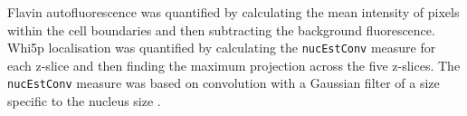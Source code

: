 Flavin autofluorescence was quantified by calculating the mean intensity of pixels within the cell boundaries and then subtracting the background fluorescence. %
Whi5p localisation was quantified by calculating the \texttt{nucEstConv} measure for each z-slice and then finding the maximum projection across the five z-slices.
The \texttt{nucEstConv} measure was based on convolution with a Gaussian filter of a size specific to the nucleus size \parencite{geronHandsOnMachineLearning2017}.

